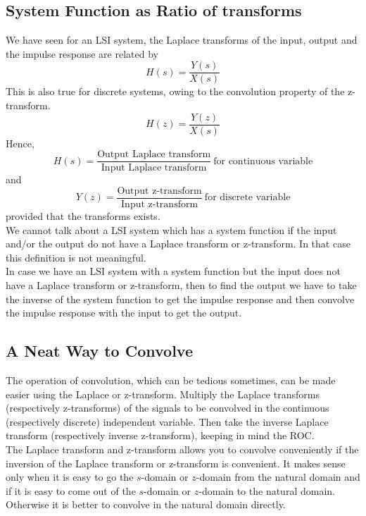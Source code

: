 {\subsection{System Function as Ratio of transforms}
We have seen for an LSI system, the Laplace transforms of the input, output and the impulse response are related by
\[
H(s)=\frac{Y(s)}{X(s)}
\]
This is also true for discrete systems, owing to the convolution property of the z-transform.
\[
H(z)=\frac{Y(z)}{X(s)}
\]
Hence, 
\[
H(s) = \frac{\text{Output Laplace transform}}{\text{Input Laplace transform}} \    \text{for continuous variable}
\]
and
\[
Y(z)= \frac{\text{Output z-transform}}{\text{Input z-transform}} \    \text{for discrete variable}
\]
provided that the transforms exists. \\
We cannot talk about a LSI system which has a system function if the input and/or the output do not have a Laplace transform or z-transform. In that case this definition is not meaningful.\\
In case we have an LSI system with a system function but the input does not have a Laplace transform or z-transform, then to find the output we have to take the inverse of the system function to get the impulse response and then convolve the impulse response with the input to get the output.
\subsection{A Neat Way to Convolve}
The operation of convolution, which can be tedious sometimes, can be made easier using the Laplace or z-transform. Multiply the Laplace transforms (respectively z-transforms) of the signals to be convolved in the continuous (respectively discrete) independent variable. Then take the inverse Laplace transform (respectively inverse z-transform), keeping in mind the ROC.\\
The Laplace transform and z-transform allows you to convolve conveniently if the inversion of the Laplace transform or z-transform is convenient. It makes sense only when it is easy to go the $s$-domain or $z$-domain from the natural domain and if it is easy to come out of the $s$-domain or $z$-domain to the natural domain. Otherwise it is better to convolve in the natural domain directly.
}
